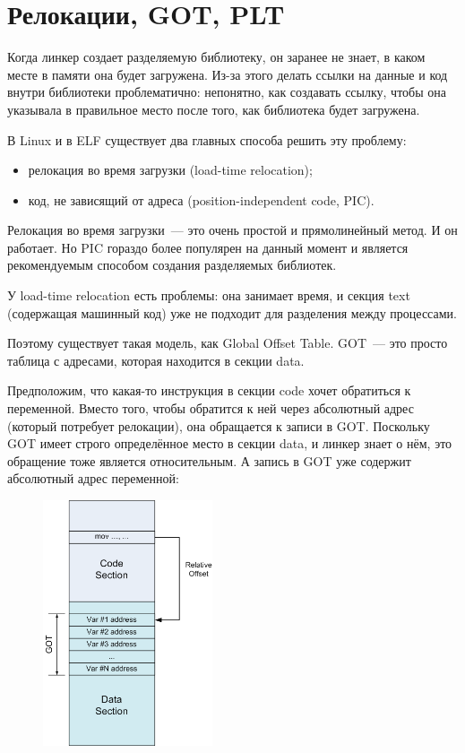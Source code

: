 \documentclass[10pt, a5paper]{article}
\begin{document}
\section*{Релокации, GOT, PLT}

Когда линкер создает разделяемую библиотеку, он заранее не знает, в каком месте в памяти она будет загружена. Из-за этого делать ссылки на данные и код внутри библиотеки проблематично: непонятно, как создавать ссылку, чтобы она указывала в правильное место после того, как библиотека будет загружена.

В Linux и в ELF существует два главных способа решить эту проблему:

\begin{itemize}
  \item релокация во время загрузки (load-time relocation);
  \item код, не зависящий от адреса (position-independent code, PIC).
\end{itemize}

Релокация во время загрузки~--- это очень простой и прямолинейный метод. И он работает. Но PIC гораздо более популярен на данный момент и является рекомендуемым способом создания разделяемых библиотек.

У load-time relocation есть проблемы: она занимает время, и секция text (содержащая машинный код) уже не подходит для разделения между процессами.

Поэтому существует такая модель, как Global Offset Table. 
GOT~--- это просто таблица с адресами, которая находится в секции data.

Предположим, что какая-то инструкция в секции code хочет обратиться к переменной. Вместо того, чтобы обратится к ней через абсолютный адрес (который потребует релокации), она обращается к записи в GOT. Поскольку GOT имеет строго определённое место в секции data, и линкер знает о нём, это обращение тоже является относительным. А запись в GOT уже содержит абсолютный адрес переменной:

\begin{center}
\begin{figure}[h!]
  \centering
  \includegraphics[width=5cm]{12_2018_Zhauniarovich2.png}
  \label{Zhauniarovich2}
\end{figure}
\end{center} 
\end{document}
